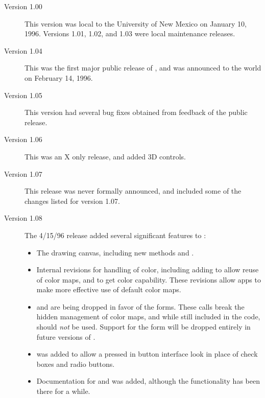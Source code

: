 \begin{description}
\item[Version 1.00]
This version was local to the University of New Mexico on January 10, 1996.
Versions 1.01, 1.02, and 1.03 were local maintenance releases.

\item[Version 1.04]
This was the first major public release of \V, and was announced
to the world on February 14, 1996.

\item[Version 1.05]
This version had several bug fixes obtained from feedback of the
public release.

\item[Version 1.06]

This was an X only release, and added 3D controls.

\item[Version 1.07]

This release was never formally announced, and included some
of the changes listed for version 1.07.

\item[Version 1.08]

The 4/15/96 release added several significant features to \V:

\begin{itemize}

\item The  drawing canvas, including new methods
 and .

\item Internal revisions for handling of color, including adding
 to allow reuse of color maps, and 
 to get color capability. These
revisions allow \V apps to make more effective use of default
color maps.

\item {} and 
are being dropped in favor of the  forms. These calls
break the hidden management of color maps, and while still included
in the code, should \emph{not} be used. Support for the 
form will be dropped entirely in future versions of \V.

\item {} was added to allow a pressed in
button interface look in place of check boxes and radio buttons.

\item Documentation for  and 
was added, although the functionality has been there for a while.


\end{itemize}
\end{description}
